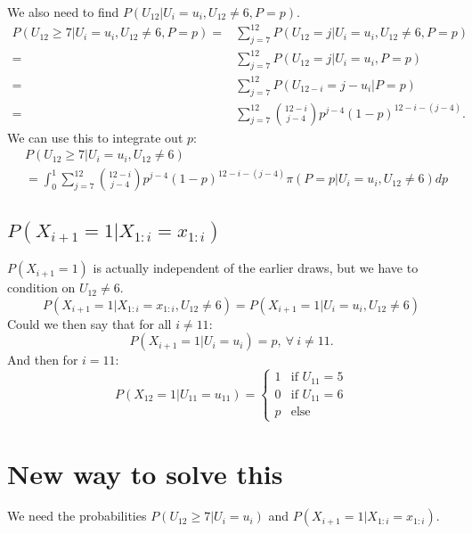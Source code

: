\documentclass{article}
\begin{document}
We also need to find $P(U_{12}|U_i=u_i,U_{12}\neq6,P=p)$.
\begin{equation*}
    \begin{aligned}
        P(U_{12}\geq7|U_i=u_i,U_{12}\neq6,P=p) 
        =&  \sum_{j=7}^{12} P(U_{12}=j|U_i=u_i,U_{12}\neq6,P=p)\\[6pt]
        =& \sum_{j=7}^{12} P(U_{12}=j|U_i=u_i,P=p)\\[6pt]
        =& \sum_{j=7}^{12} P(U_{12-i}=j-u_i|P=p)\\[6pt]
        =& \sum_{j=7}^{12} \binom{12-i}{j-4}p^{j-4}(1-p)^{12-i-(j-4)}.
    \end{aligned}
\end{equation*}
We can use this to integrate out $p$:
\begin{equation*}
    \begin{aligned}
        &P(U_{12}\geq7|U_i=u_i,U_{12}\neq6)\\[6pt]
        &=\int^1_0 \sum_{j=7}^{12} \binom{12-i}{j-4}p^{j-4}(1-p)^{12-i-(j-4)} \pi(P=p|U_i=u_i,U_{12}\neq6) dp   
    \end{aligned}
\end{equation*}


\subsection{$P(X_{i+1}=1|X_{1:i}=x_{1:i})$}
$P(X_{i+1}=1)$ is actually independent of the earlier draws, but we have to condition on $U_{12}\neq6$.
\begin{equation*}
    P(X_{i+1}=1|X_{1:i}=x_{1:i},U_{12}\neq6) = P(X_{i+1}=1|U_{i}=u_{i},U_{12}\neq6)
\end{equation*}
Could we then say that for all $i\neq11$:
\begin{equation*}
    P(X_{i+1}=1|U_i=u_i)=p, \: \forall \:i\neq11.
\end{equation*}
And then for $i=11$:
\begin{equation*}
    P(X_{12}=1|U_{11}=u_{11}) = 
    \begin{cases}
        1 &\text{if } U_{11}=5 \\
        0 &\mbox{if } U_{11}=6\\
        p &\text{else}
    \end{cases}
\end{equation*}

\newpage
\section{New way to solve this}
We need the probabilities $P(U_{12} \geq 7|U_i=u_i)$ and $P(X_{i+1}=1|X_{1:i}=x_{1:i})$.
\end{document}
